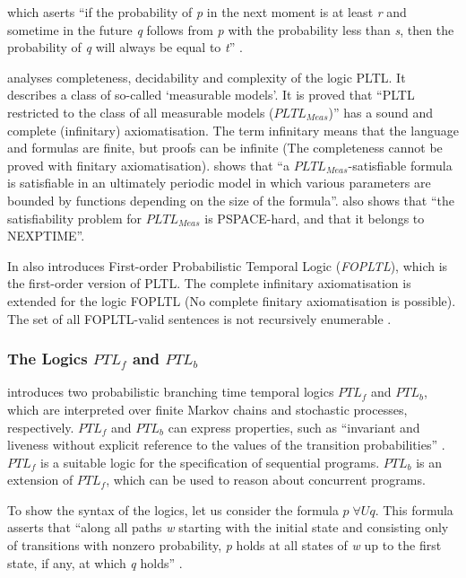 \documentclass[11pt]{article}
\begin{document}
\noindent which aserts ``if the probability of \textit{p} in the next moment is at least \textit{r} and sometime in the future \textit{q} follows from \textit{p} with the probability less than \textit{s}, then the probability of \textit{q} will always be equal to \textit{t}''  \cite{Ogn06}.

\cite{Ogn06} analyses completeness, decidability and complexity of the logic PLTL. It describes a class of so-called `measurable models'. It is proved that ``PLTL restricted to the class of all measurable models ($PLTL_{Meas}$)'' has a sound and complete (infinitary) axiomatisation. The term infinitary means that the language and formulas are finite, but proofs can be infinite (The completeness cannot be proved with finitary axiomatisation). \cite{Ogn06}  shows that ``a $PLTL_{Meas}$-satisfiable formula is satisfiable in an ultimately periodic model in which various parameters are bounded by functions depending on the size of the formula''. \cite{Ogn06} also shows that ``the satisfiability problem for  $PLTL_{Meas}$ is PSPACE-hard, and that it belongs to NEXPTIME''.

In \cite{Ogn06} also introduces First-order Probabilistic Temporal Logic (\textit{FOPLTL}), which is the first-order version of PLTL. The complete infinitary axiomatisation is extended for the logic FOPLTL (No complete finitary axiomatisation is possible). The set of all FOPLTL-valid sentences is not recursively enumerable \cite{GHR94}.


\subsubsection{The Logics $PTL_{f}$ and $PTL_{b}$}

\cite{HS84} introduces two probabilistic branching time temporal logics $PTL_{f}$  and $PTL_{b}$, which are interpreted over finite Markov chains and stochastic processes, respectively. $PTL_{f}$ and $PTL_{b}$ can express properties, such as 
``invariant and liveness without explicit reference to the values of the transition probabilities'' \cite{HS84}. $PTL_{f}$ is a suitable logic for the specification of sequential programs. $PTL_{b}$ is an extension of $PTL_{f}$, which can be used to reason about concurrent programs. 

To show the syntax of the logics, let us consider the formula $p \; \forall U q$. This formula asserts that ``along all paths \emph{w} starting with the initial state and consisting only of transitions with nonzero probability, \emph{p} holds at all states of \emph{w} up to the first state, if any, at which \emph{q} holds'' \cite{HS84}.
\end{document}
